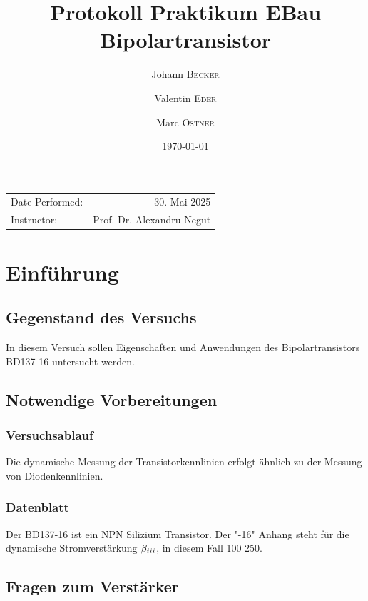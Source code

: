\documentclass[
	a4paper, %
	12pt, %
]{CSUniSchoolLabReport}
\title{Protokoll Praktikum EBau Bipolartransistor} %
\author{Johann \textsc{Becker} \and Valentin \textsc{Eder} \and Marc \textsc{Ostner}}
\date{\today} %
\newcommand{\RNum}[1]{\uppercase\expandafter{\romannumeral #1\relax}}%
\begin{document}
\maketitle %

\begin{center}
	\begin{tabular}{l r}
		Date Performed: & 30. Mai 2025 \\ %
		
		Instructor: & Prof. Dr. Alexandru Negut %
	\end{tabular}
\end{center}



\section{Einführung}
\subsection{Gegenstand des Versuchs}
In diesem Versuch sollen Eigenschaften und Anwendungen des Bipolartransistors BD137-16 untersucht werden.
\subsection{Notwendige Vorbereitungen}
\subsubsection{Versuchsablauf}
Die dynamische Messung der Transistorkennlinien erfolgt ähnlich zu der Messung von Diodenkennlinien.
\subsubsection{Datenblatt}
Der BD137-16 ist ein NPN Silizium Transistor. 
Der "-16" Anhang steht für die dynamische Stromverstärkung $\beta_{\RNum{3}}$, in diesem Fall 100  250. 

\subsection{Fragen zum Verstärker}
\end{document}
